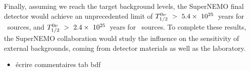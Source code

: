 Finally, assuming we reach the target background levels, the SuperNEMO final detector would achieve an unprecedented limit of $T_{1/2}^{0\nu}~>~5.4\times~10^{25}$~years for \Se\ sources, and $T_{1/2}^{0\nu}~>~2.4\times~10^{25}$~years for \Nd\ sources.
To complete these results, the SuperNEMO collaboration would study the influence on the sensitivity of external backgrounds, coming from detector materials as well as the laboratory.





\begin{itemize}
\item écrire commentaires tab bdf
\end{itemize}
